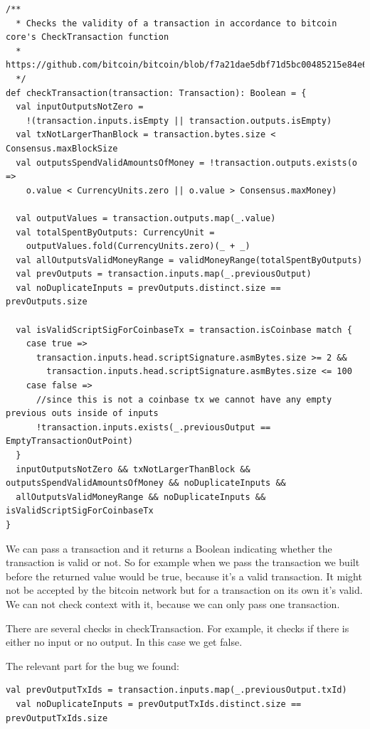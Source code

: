 \documentclass[runningheads]{llncs}
\begin{document}
\begin{lstlisting}[style=scala]
/**
  * Checks the validity of a transaction in accordance to bitcoin core's CheckTransaction function
  * https://github.com/bitcoin/bitcoin/blob/f7a21dae5dbf71d5bc00485215e84e6f2b309d0a/src/main.cpp#L939.
  */
def checkTransaction(transaction: Transaction): Boolean = {
  val inputOutputsNotZero =
    !(transaction.inputs.isEmpty || transaction.outputs.isEmpty)
  val txNotLargerThanBlock = transaction.bytes.size < Consensus.maxBlockSize
  val outputsSpendValidAmountsOfMoney = !transaction.outputs.exists(o =>
    o.value < CurrencyUnits.zero || o.value > Consensus.maxMoney)

  val outputValues = transaction.outputs.map(_.value)
  val totalSpentByOutputs: CurrencyUnit =
    outputValues.fold(CurrencyUnits.zero)(_ + _)
  val allOutputsValidMoneyRange = validMoneyRange(totalSpentByOutputs)
  val prevOutputs = transaction.inputs.map(_.previousOutput)
  val noDuplicateInputs = prevOutputs.distinct.size == prevOutputs.size

  val isValidScriptSigForCoinbaseTx = transaction.isCoinbase match {
    case true =>
      transaction.inputs.head.scriptSignature.asmBytes.size >= 2 &&
        transaction.inputs.head.scriptSignature.asmBytes.size <= 100
    case false =>
      //since this is not a coinbase tx we cannot have any empty previous outs inside of inputs
      !transaction.inputs.exists(_.previousOutput == EmptyTransactionOutPoint)
  }
  inputOutputsNotZero && txNotLargerThanBlock && outputsSpendValidAmountsOfMoney && noDuplicateInputs &&
  allOutputsValidMoneyRange && noDuplicateInputs && isValidScriptSigForCoinbaseTx
}
\end{lstlisting}

We can pass a transaction and it returns a Boolean indicating whether
the transaction is valid or not.  So for example when we pass the
transaction we built before the returned value would be true, because
it's a valid transaction.  It might not be accepted by the bitcoin
network but for a transaction on its own it's valid.  We can not check
context with it, because we can only pass one transaction.

There are several checks in checkTransaction.
For example, it checks if there is either no input or no output.
In this case we get false.

The relevant part for the bug we found:
\begin{lstlisting}[style=scala]
  val prevOutputTxIds = transaction.inputs.map(_.previousOutput.txId)
  val noDuplicateInputs = prevOutputTxIds.distinct.size == prevOutputTxIds.size
\end{lstlisting}
\end{document}
